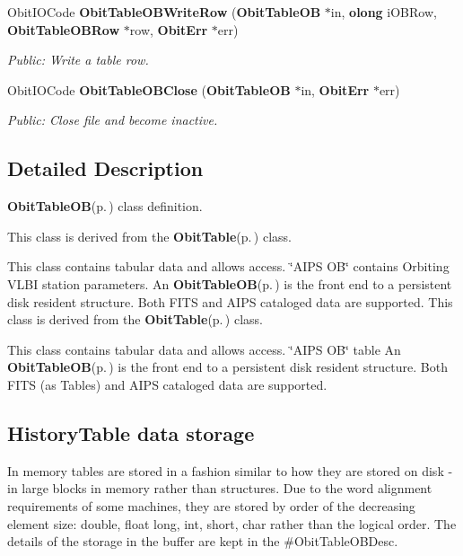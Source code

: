 \begin{CompactItemize}
Obit\-IOCode {\bf Obit\-Table\-OBWrite\-Row} ({\bf Obit\-Table\-OB} $\ast$in, {\bf olong} i\-OBRow, {\bf Obit\-Table\-OBRow} $\ast$row, {\bf Obit\-Err} $\ast$err)
\begin{CompactList}\small\item\em Public: Write a table row. \item\end{CompactList}\item 
Obit\-IOCode {\bf Obit\-Table\-OBClose} ({\bf Obit\-Table\-OB} $\ast$in, {\bf Obit\-Err} $\ast$err)
\begin{CompactList}\small\item\em Public: Close file and become inactive. \item\end{CompactList}\end{CompactItemize}


\subsection{Detailed Description}
{\bf Obit\-Table\-OB}{\rm (p.\,\pageref{structObitTableOB})} class definition. 

This class is derived from the {\bf Obit\-Table}{\rm (p.\,\pageref{structObitTable})} class.

This class contains tabular data and allows access. \char`\"{}AIPS OB\char`\"{} contains Orbiting VLBI station parameters. An {\bf Obit\-Table\-OB}{\rm (p.\,\pageref{structObitTableOB})} is the front end to a persistent disk resident structure. Both FITS and AIPS cataloged data are supported. This class is derived from the {\bf Obit\-Table}{\rm (p.\,\pageref{structObitTable})} class.

This class contains tabular data and allows access. \char`\"{}AIPS OB\char`\"{} table An {\bf Obit\-Table\-OB}{\rm (p.\,\pageref{structObitTableOB})} is the front end to a persistent disk resident structure. Both FITS (as Tables) and AIPS cataloged data are supported.\subsection{History\-Table data storage}\label{ObitTableWX_8h_TableDataStorage}
In memory tables are stored in a fashion similar to how they are stored on disk - in large blocks in memory rather than structures. Due to the word alignment requirements of some machines, they are stored by order of the decreasing element size: double, float long, int, short, char rather than the logical order. The details of the storage in the buffer are kept in the \#Obit\-Table\-OBDesc.

